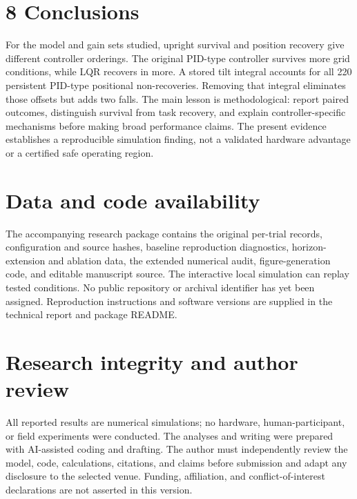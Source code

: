 \documentclass[11pt,a4paper]{article}
\begin{document}
\section*{8 Conclusions}
For the model and gain sets studied, upright survival and position recovery give different controller orderings. The original PID-type controller survives more grid conditions, while LQR recovers in more. A stored tilt integral accounts for all 220 persistent PID-type positional non-recoveries. Removing that integral eliminates those offsets but adds two falls. The main lesson is methodological: report paired outcomes, distinguish survival from task recovery, and explain controller-specific mechanisms before making broad performance claims. The present evidence establishes a reproducible simulation finding, not a validated hardware advantage or a certified safe operating region.

\section*{Data and code availability}
The accompanying research package contains the original per-trial records, configuration and source hashes, baseline reproduction diagnostics, horizon-extension and ablation data, the extended numerical audit, figure-generation code, and editable manuscript source. The interactive local simulation can replay tested conditions. No public repository or archival identifier has yet been assigned. Reproduction instructions and software versions are supplied in the technical report and package README.

\section*{Research integrity and author review}
All reported results are numerical simulations; no hardware, human-participant, or field experiments were conducted. The analyses and writing were prepared with AI-assisted coding and drafting. The author must independently review the model, code, calculations, citations, and claims before submission and adapt any disclosure to the selected venue. Funding, affiliation, and conflict-of-interest declarations are not asserted in this version.
\end{document}
